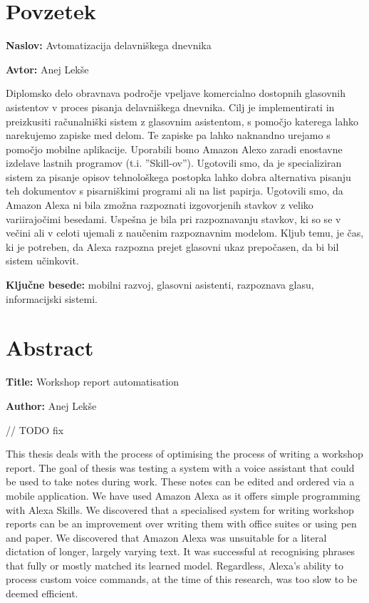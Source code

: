 \documentclass[a4paper, 12pt]{book}
\newcommand{\ttitle}{Avtomatizacija delavniškega dnevnika}
\newcommand{\ttitleEn}{Workshop report automatisation}
\newcommand{\tauthor}{Anej Lekše}
\newcommand{\tkeywords}{mobilni razvoj, glasovni asistenti, razpoznava glasu, informacijski sistemi}
\newcommand{\clearemptydoublepage}{\newpage{\pagestyle{empty}\cleardoublepage}}
\begin{document}
\chapter*{Povzetek}

\noindent\textbf{Naslov:} \ttitle
\bigskip

\noindent\textbf{Avtor:} \tauthor
\bigskip


\noindent Diplomsko delo obravnava področje vpeljave komercialno dostopnih glasovnih asistentov v proces pisanja delavniškega dnevnika.
Cilj je implementirati in preizkusiti računalniški sistem z glasovnim asistentom, s pomočjo katerega lahko narekujemo zapiske med delom. 
Te zapiske pa lahko naknandno urejamo s pomočjo mobilne aplikacije.
Uporabili bomo Amazon Alexo zaradi enostavne izdelave lastnih programov (t.i. ''Skill-ov'').
Ugotovili smo, da je specializiran sistem za pisanje opisov tehnološkega postopka lahko dobra alternativa pisanju teh dokumentov s pisarniškimi programi ali na list papirja.
Ugotovili smo, da Amazon Alexa ni bila zmožna razpoznati izgovorjenih stavkov z veliko variirajočimi besedami.
Uspešna je bila pri razpoznavanju stavkov, ki so se v večini ali v celoti ujemali z naučenim razpoznavnim modelom.
Kljub temu, je čas, ki je potreben, da Alexa razpozna prejet glasovni ukaz prepočasen, da bi bil sistem učinkovit.
\bigskip

\noindent\textbf{Ključne besede:} \tkeywords.
\clearemptydoublepage

\chapter*{Abstract}

\noindent\textbf{Title:} \ttitleEn
\bigskip

\noindent\textbf{Author:} \tauthor
\bigskip

// TODO fix 

\noindent This thesis deals with the process of optimising the process of writing a workshop report.
The goal of thesis was testing a system with a voice assistant that could be used to take notes during work.
These notes can be edited and ordered via a mobile application.
We have used Amazon Alexa as it offers simple programming with Alexa Skills.
We discovered that a specialised system for writing workshop reports can be an improvement over writing them with office suites or using pen and paper.
We discovered that Amazon Alexa was unsuitable for a literal dictation of longer, largely varying text.
It was successful at recognising phrases that fully or mostly matched its learned model.
Regardless, Alexa's ability to process custom voice commands, at the time of this research, was too slow to be deemed efficient.
\end{document}
